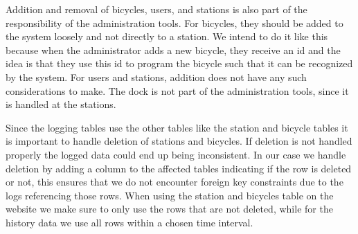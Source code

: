 Addition and removal of bicycles, users, and stations is also part of the responsibility of the administration tools. 
For bicycles, they should be added to the system loosely and not directly to a station.
We intend to do it like this because when the administrator adds a new bicycle, they receive an id and the idea is that they use this id to program the bicycle such that it can be recognized by the system.
For users and stations, addition does not have any such considerations to make. 
The dock is not part of the administration tools, since it is handled at the stations.

Since the logging tables use the other tables like the station and bicycle tables it is important to handle deletion of stations and bicycles. 
If deletion is not handled properly the logged data could end up being inconsistent. 
In our case we handle deletion by adding a column to the affected tables indicating if the row is deleted or not, this ensures that we do not encounter foreign key constraints due to the logs referencing those rows. 
When using the station and bicycles table on the website we make sure to only use the rows that are not deleted, while for the history data we use all rows within a chosen time interval.